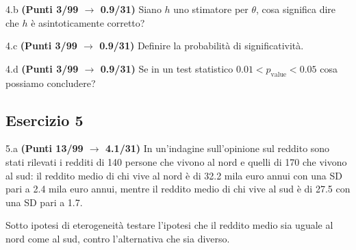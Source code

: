 \documentclass[
  11pt,
]{book}
\theoremstyle{mytheoremstyle}
\theoremstyle{mydefstyle}
\begin{document}
4.b \textbf{(Punti 3/99 \(\rightarrow\) 0.9/31)} Siano \(h\) uno stimatore per \(\theta\), cosa significa dire che \(h\) è asintoticamente corretto?

4.c \textbf{(Punti 3/99 \(\rightarrow\) 0.9/31)} Definire la probabilità di significatività.

4.d \textbf{(Punti 3/99 \(\rightarrow\) 0.9/31)} Se in un test statistico \(0.01 < p_\text{value} <0.05\) cosa possiamo concludere?

\subsection{Esercizio 5}\label{esercizio-5-10}

5.a \textbf{(Punti 13/99 \(\rightarrow\) 4.1/31)} In un'indagine sull'opinione sul reddito sono stati rilevati i redditi di 140 persone che vivono al nord e quelli di 170 che vivono al sud: il reddito medio di chi vive al nord è di 32.2 mila euro annui con una SD pari a 2.4 mila euro annui, mentre il
reddito medio di chi vive al sud è di 27.5 con una SD pari a 1.7.

Sotto ipotesi di eterogeneità testare l'ipotesi che il reddito medio sia uguale al nord come al sud, contro l'alternativa che sia diverso.
\end{document}
